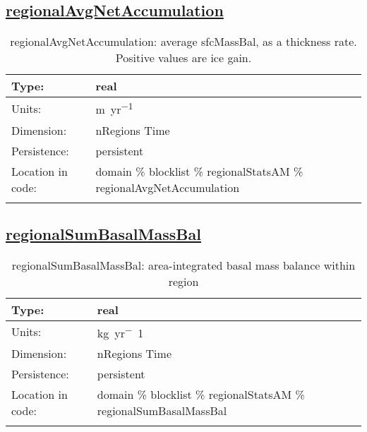 \subsection[regionalAvgNetAccumulation]{\hyperref[sec:var_tab_regionalStatsAM]{regionalAvgNetAccumulation}}
\label{subsec:var_sec_regionalStatsAM_regionalAvgNetAccumulation}
\begin{center}
\begin{longtable}{| p{2.0in} | p{4.0in} |}
        \hline 
        Type: & real \\
        \hline 
        Units: & \si{m.yr^{-1}} \\
        \hline 
        Dimension: & nRegions Time \\
        \hline 
        Persistence: & persistent \\
        \hline 
         Location in code: & domain \% blocklist \% regionalStatsAM \% regionalAvgNetAccumulation \\
         \hline 
    \caption{regionalAvgNetAccumulation: average sfcMassBal, as a thickness rate. Positive values are ice gain.}
\end{longtable}
\end{center}
\subsection[regionalSumBasalMassBal]{\hyperref[sec:var_tab_regionalStatsAM]{regionalSumBasalMassBal}}
\label{subsec:var_sec_regionalStatsAM_regionalSumBasalMassBal}
\begin{center}
\begin{longtable}{| p{2.0in} | p{4.0in} |}
        \hline 
        Type: & real \\
        \hline 
        Units: & \si{kg.yr^-1} \\
        \hline 
        Dimension: & nRegions Time \\
        \hline 
        Persistence: & persistent \\
        \hline 
         Location in code: & domain \% blocklist \% regionalStatsAM \% regionalSumBasalMassBal \\
         \hline 
    \caption{regionalSumBasalMassBal: area-integrated basal mass balance within region}
\end{longtable}
\end{center}
